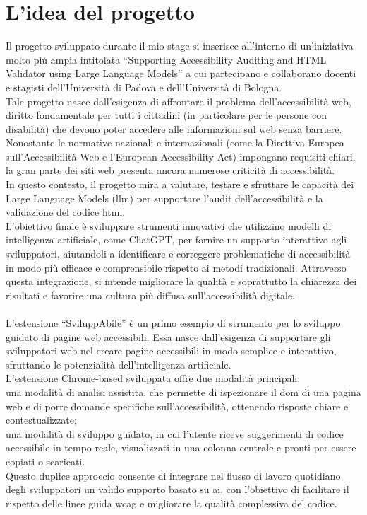 \section{L'idea del progetto}
\noindent Il progetto sviluppato durante il mio stage si inserisce all’interno di un’iniziativa molto più ampia intitolata “Supporting Accessibility Auditing and HTML Validator using Large Language Models” a cui partecipano e collaborano docenti e stagisti dell’Università di Padova e dell’Università di Bologna.\\
Tale progetto nasce dall’esigenza di affrontare il problema dell’accessibilità web, diritto fondamentale per tutti i cittadini (in particolare per le persone con disabilità) che devono poter accedere alle informazioni sul web senza barriere.\\
Nonostante le normative nazionali e internazionali (come la Direttiva Europea sull’Accessibilità Web e l’European Accessibility Act) impongano requisiti chiari, la gran parte dei siti web presenta ancora numerose criticità di accessibilità.\\
In questo contesto, il progetto mira a valutare, testare e sfruttare le capacità dei Large Language Models (\acrshort{llm}) per supportare l’audit dell’accessibilità e la validazione del codice \acrshort{html}.\\
L’obiettivo finale è sviluppare strumenti innovativi che utilizzino modelli di intelligenza artificiale, come ChatGPT, per fornire un supporto interattivo agli sviluppatori, aiutandoli a identificare e correggere problematiche di accessibilità in modo più efficace e comprensibile rispetto ai metodi tradizionali. Attraverso questa integrazione, si intende migliorare la qualità e soprattutto la chiarezza dei risultati e favorire una cultura più diffusa sull’accessibilità digitale.\\
\\
L’estensione “SviluppAbile” è un primo esempio di strumento per lo sviluppo guidato di pagine web accessibili.
Essa nasce dall’esigenza di supportare gli sviluppatori web nel creare pagine accessibili in modo semplice e interattivo, sfruttando le potenzialità dell’intelligenza artificiale.\\
L’estensione Chrome-based sviluppata offre due modalità principali:\\
una modalità di analisi assistita, che permette di ispezionare il \acrshort{dom} di una pagina web e di porre domande specifiche sull’accessibilità, ottenendo risposte chiare e contestualizzate; \\
una modalità di sviluppo guidato, in cui l’utente riceve suggerimenti di codice accessibile in tempo reale, visualizzati in una colonna centrale e pronti per essere copiati o scaricati. \\
Questo duplice approccio consente di integrare nel flusso di lavoro quotidiano degli sviluppatori un valido supporto basato su \acrshort{ai}, con l’obiettivo di facilitare il rispetto delle linee guida \acrshort{wcag} e migliorare la qualità complessiva del codice.

